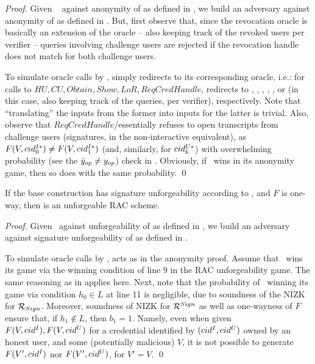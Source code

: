 \begin{proof}
  Given \adv~ against anonymity of \CUASRAC as defined in
  , we build an adversary \advB against anonymity of
  \CUASGen as defined in .
  But, first observe that, since the revocation oracle is basically an extension
  of the \OPEN oracle -- also keeping track of the revoked users per verifier --
  queries involving challenge users are rejected if the revocation handle does
  not match for both challenge users.
  
  To simulate oracle calls by \adv, \advB simply redirects to its corresponding
  oracle, i.e.: for calls to $HU,CU,Obtain,Show,LoR,ReqCredHandle$, \advB
  redirects to \HUGEN, \CUGEN, \OBTAIN, \SIGN, \CHALb, or \OPEN (in this case,
  also keeping track of the queries, per verifier), respectively.
  Note that ``translating'' the inputs from the former into inputs for the
  latter is trivial. Also, observe that $ReqCredHandle$/\OPEN essentially
  refuses to open transcripts from challenge users (signatures, in the
  non-interactive equivalent), as $F(V,cid^{I*}_0) \neq F(V,cid^{I*}_1)$ (and,
  similarly, for $cid^{U*}_b$) with overwhelming probability (see the $\tilde{y}_{op}
  \neq y_{op}$) check in . Obviously, if \adv~wins in its
  anonymity game, then so does \advB with the same probability.
  \qed
\end{proof}

\begin{theorem}
  If the base \CUASGen construction has signature unforgeability according to
  , and $F$ is one-way, then \CUASRAC is an
  unforgeable RAC scheme.
\end{theorem}

\begin{proof}
  Given \adv~against unforgeability of \CUASRAC as defined in
  , we build an adversary \advB against signature
  unforgeability of \CUASGen as defined in .

  To simulate oracle calls by \adv, \advB acts as in the anonymity proof. Assume
  that \adv~wins its game via the winning condition of line 9 in the RAC
  unforgeability game. The same reasoning as in \CUASAC applies here. Next, note
  that the probability of \adv~winning its game via condition $h_0 \in L$ at
  line 11 is negligible, due to soundness of the NIZK for $\mathcal{R}_{Sign}$.
  Moreover, soundness of NIZK for $\mathcal{R}^{Sign}$ as well as one-wayness
  of $F$ ensure that, if $h_1 \notin L$, then $b_1 = 1$. Namely, even when given
  $F(V,cid^I),F(V,cid^U)$ for a credential identified by $(cid^I,cid^U)$ owned
  by an honest user, and some (potentially malicious) $V$, it is not possible to
  generate $F(V',cid^I)$ nor $F(V',cid^U)$, for $V'=V$.
  \qed
\end{proof}

